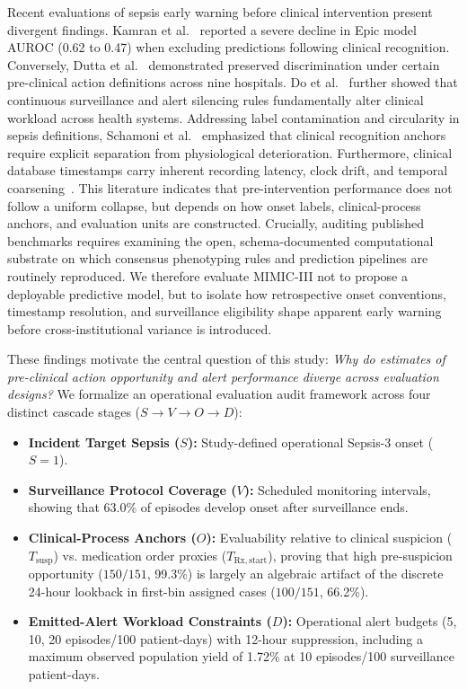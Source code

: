\documentclass[10pt,twocolumn,a4paper]{article}
\begin{document}
Recent evaluations of sepsis early warning before clinical intervention present divergent findings. Kamran et al.~\cite{kamran2024evaluation} reported a severe decline in Epic model AUROC (0.62 to 0.47) when excluding predictions following clinical recognition. Conversely, Dutta et al.~\cite{dutta2026performance} demonstrated preserved discrimination under certain pre-clinical action definitions across nine hospitals. Do et al.~\cite{do2026continuous} further showed that continuous surveillance and alert silencing rules fundamentally alter clinical workload across health systems. Addressing label contamination and circularity in sepsis definitions, Schamoni et al.~\cite{schamoni2019leveraging} emphasized that clinical recognition anchors require explicit separation from physiological deterioration. Furthermore, clinical database timestamps carry inherent recording latency, clock drift, and temporal coarsening~\cite{vandervegt2022timing}. This literature indicates that pre-intervention performance does not follow a uniform collapse, but depends on how onset labels, clinical-process anchors, and evaluation units are constructed. Crucially, auditing published benchmarks requires examining the open, schema-documented computational substrate on which consensus phenotyping rules and prediction pipelines are routinely reproduced. We therefore evaluate MIMIC-III not to propose a deployable predictive model, but to isolate how retrospective onset conventions, timestamp resolution, and surveillance eligibility shape apparent early warning before cross-institutional variance is introduced.

These findings motivate the central question of this study: \textit{Why do estimates of pre-clinical action opportunity and alert performance diverge across evaluation designs?} We formalize an operational evaluation audit framework across four distinct cascade stages ($S \to V \to O \to D$):
\begin{itemize}
    \setlength{\itemsep}{0pt}
    \setlength{\parsep}{0pt}
    \setlength{\parskip}{0pt}
    \item \textbf{Incident Target Sepsis ($S$):} Study-defined operational Sepsis-3 onset ($S=1$).
    \item \textbf{Surveillance Protocol Coverage ($V$):} Scheduled monitoring intervals, showing that 63.0\% of episodes develop onset after surveillance ends.
    \item \textbf{Clinical-Process Anchors ($O$):} Evaluability relative to clinical suspicion ($T_{\mathrm{susp}}$) vs. medication order proxies ($T_{\mathrm{Rx,start}}$), proving that high pre-suspicion opportunity ($150/151$, 99.3\%) is largely an algebraic artifact of the discrete 24-hour lookback in first-bin assigned cases ($100/151$, 66.2\%).
    \item \textbf{Emitted-Alert Workload Constraints ($D$):} Operational alert budgets (5, 10, 20 episodes/100 patient-days) with 12-hour suppression, including a maximum observed population yield of 1.72\% at 10 episodes/100 surveillance patient-days.
\end{itemize}
\end{document}
